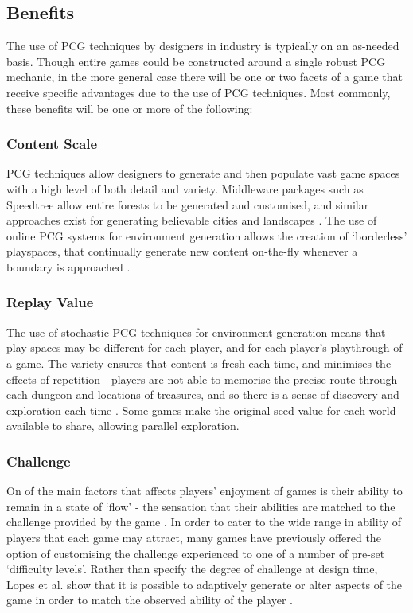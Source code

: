 \documentclass{acm_proc_article-sp}
\begin{document}
\newpage
\subsection{Benefits}
The use of PCG techniques by designers in industry is typically on an as-needed basis. Though entire games could be constructed around a single robust PCG mechanic, in the more general case there will be one or two facets of a game that receive specific advantages due to the use of PCG techniques. Most commonly, these benefits will be one or more of the following:


\subsubsection{Content Scale}
PCG techniques allow designers to generate and then populate vast game spaces with a high level of both detail and variety. Middleware packages such as Speedtree\cite{speedtree} allow entire forests to be generated and customised, and similar approaches exist for generating believable cities and landscapes \cite{carli2011survey}. The use of online PCG systems for environment generation allows the creation of `borderless' playspaces, that continually generate new content on-the-fly whenever a boundary is approached \cite{mario}.

\subsubsection{Replay Value}
The use of stochastic PCG techniques for environment generation means that play-spaces may be different for each player, and for each player's playthrough of a game. The variety ensures that content is fresh each time, and minimises the effects of repetition - players are not able to memorise the precise route through each dungeon and locations of treasures, and so there is a sense of discovery and exploration each time \cite{hendrikx2012procedural}. Some games make the original seed value for each world available to share, allowing parallel exploration.

\subsubsection{Challenge}
On of the main factors that affects players' enjoyment of games is their ability to remain in a state of `flow' - the sensation that their abilities are matched to the challenge provided by the game \cite{flow}.
In order to cater to the wide range in ability of players that each game may attract, many games have previously offered the option of customising the challenge experienced to one of a number of pre-set `difficulty levels'. 
Rather than specify the degree of challenge at design time, Lopes et al. show that it is possible to adaptively generate or alter aspects of the game \cite{lopes2011adaptivity} in order to match the observed ability of the player \cite{ResE5}.
\end{document}
